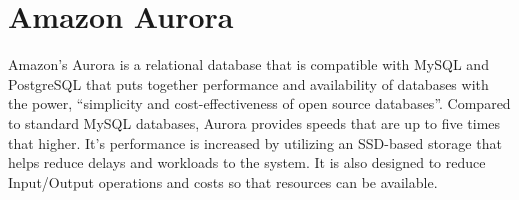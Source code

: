 \section{Amazon Aurora}
Amazon’s Aurora is a relational database that is compatible with MySQL and PostgreSQL that puts together performance and availability of databases with the power, “simplicity and cost-effectiveness of open source databases”\cite{hid-sp18-512-amazon-aurora}. Compared to standard MySQL databases, Aurora provides speeds that are up to five times that higher. It’s performance is increased by utilizing an SSD-based storage that helps reduce delays and workloads to the system. It is also designed to reduce Input/Output operations and costs so that resources can be available.  
